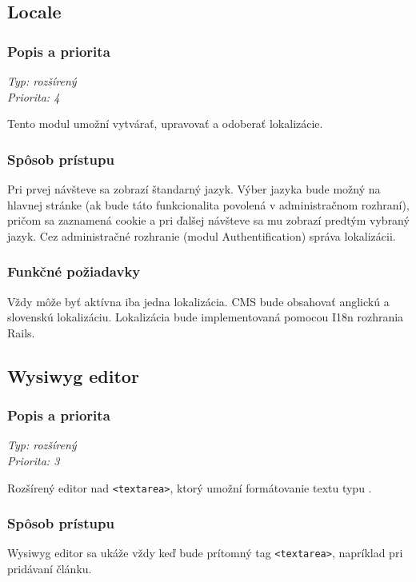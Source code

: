 \documentclass[a4paper,titlepage,11pt]{article}
\begin{document}
\subsection{Locale}
\subsubsection{Popis a priorita}
\begin{flushleft}
 \emph{Typ: rozšírený}\\
 \emph{Priorita: 4}\\
\end{flushleft}
Tento modul umožní vytvárať, upravovať a odoberať lokalizácie.
\subsubsection{Spôsob prístupu}
Pri prvej návšteve sa zobrazí štandarný jazyk. Výber jazyka bude možný na hlavnej stránke (ak bude táto funkcionalita povolená v administračnom rozhraní), pričom sa zaznamená cookie a pri ďalšej návšteve sa mu zobrazí predtým vybraný jazyk.
Cez administračné rozhranie (modul Authentification) správa lokalizácii.
\subsubsection{Funkčné požiadavky}
Vždy môže byť aktívna iba jedna lokalizácia. CMS bude obsahovať anglickú a slovenskú lokalizáciu. 
Lokalizácia bude implementovaná pomocou I18n rozhrania Rails.

\subsection{Wysiwyg editor}
\subsubsection{Popis a priorita}
\begin{flushleft}
 \emph{Typ: rozšírený}\\
 \emph{Priorita: 3}\\
\end{flushleft}
Rozšírený editor nad \verb|<textarea>|, ktorý umožní formátovanie textu typu .
\subsubsection{Spôsob prístupu}
Wysiwyg editor sa ukáže vždy keď bude prítomný tag \verb|<textarea>|, napríklad pri pridávaní článku.
\end{document}
